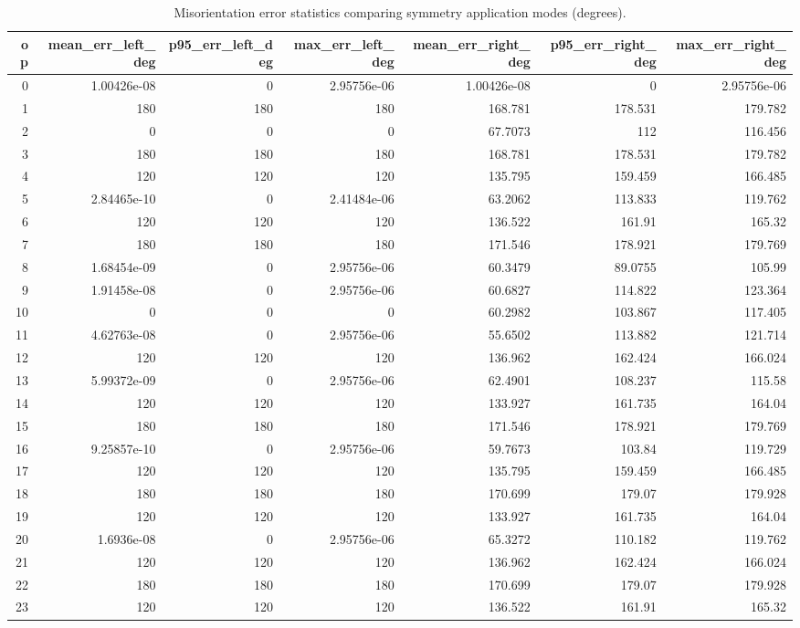 \begin{table}
\caption{Misorientation error statistics comparing symmetry application modes (degrees).}
\label{tab:symmetry_action_errors}
\begin{tabular}{rrrrrrr}
\toprule
op & mean_err_left_deg & p95_err_left_deg & max_err_left_deg & mean_err_right_deg & p95_err_right_deg & max_err_right_deg \\
\midrule
0 & 1.00426e-08 & 0 & 2.95756e-06 & 1.00426e-08 & 0 & 2.95756e-06 \\
1 & 180 & 180 & 180 & 168.781 & 178.531 & 179.782 \\
2 & 0 & 0 & 0 & 67.7073 & 112 & 116.456 \\
3 & 180 & 180 & 180 & 168.781 & 178.531 & 179.782 \\
4 & 120 & 120 & 120 & 135.795 & 159.459 & 166.485 \\
5 & 2.84465e-10 & 0 & 2.41484e-06 & 63.2062 & 113.833 & 119.762 \\
6 & 120 & 120 & 120 & 136.522 & 161.91 & 165.32 \\
7 & 180 & 180 & 180 & 171.546 & 178.921 & 179.769 \\
8 & 1.68454e-09 & 0 & 2.95756e-06 & 60.3479 & 89.0755 & 105.99 \\
9 & 1.91458e-08 & 0 & 2.95756e-06 & 60.6827 & 114.822 & 123.364 \\
10 & 0 & 0 & 0 & 60.2982 & 103.867 & 117.405 \\
11 & 4.62763e-08 & 0 & 2.95756e-06 & 55.6502 & 113.882 & 121.714 \\
12 & 120 & 120 & 120 & 136.962 & 162.424 & 166.024 \\
13 & 5.99372e-09 & 0 & 2.95756e-06 & 62.4901 & 108.237 & 115.58 \\
14 & 120 & 120 & 120 & 133.927 & 161.735 & 164.04 \\
15 & 180 & 180 & 180 & 171.546 & 178.921 & 179.769 \\
16 & 9.25857e-10 & 0 & 2.95756e-06 & 59.7673 & 103.84 & 119.729 \\
17 & 120 & 120 & 120 & 135.795 & 159.459 & 166.485 \\
18 & 180 & 180 & 180 & 170.699 & 179.07 & 179.928 \\
19 & 120 & 120 & 120 & 133.927 & 161.735 & 164.04 \\
20 & 1.6936e-08 & 0 & 2.95756e-06 & 65.3272 & 110.182 & 119.762 \\
21 & 120 & 120 & 120 & 136.962 & 162.424 & 166.024 \\
22 & 180 & 180 & 180 & 170.699 & 179.07 & 179.928 \\
23 & 120 & 120 & 120 & 136.522 & 161.91 & 165.32 \\
\bottomrule
\end{tabular}
\end{table}
